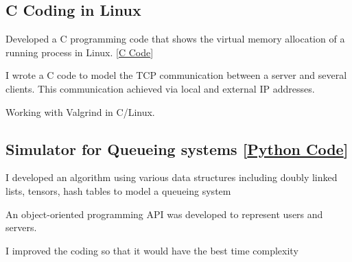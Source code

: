 \documentclass[letter,10pt]{article}
\begin{document}
	\subsection{C Coding in Linux}
	\begin{zitemize}
		\item Developed a C programming code that shows the virtual memory allocation of a running process in Linux. [\href{https://github.com/Hadi2525/vmemory_maps}{C Code}]
		\item I wrote a C code to model the TCP communication between a server and several clients. This communication achieved via local and external IP addresses.
		\item Working with Valgrind in C/Linux.
	\end{zitemize}

	\subsection{Simulator for Queueing systems [\href{https://github.com/Hadi2525/queueing_theory}{Python Code}]}
	\begin{zitemize}
		\item I developed an algorithm using various data structures including doubly linked lists, tensors, hash tables to model a queueing system
		\item An object-oriented programming API was developed to represent users and servers.
		\item I improved the coding so that it would have the best time complexity 
	\end{zitemize}
	
	
\end{document}
